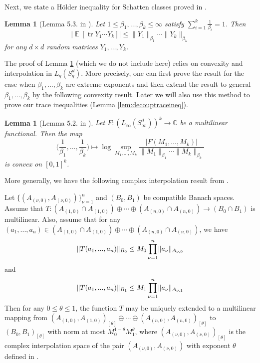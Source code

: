 \documentclass[11pt]{amsart}
\numberwithin{equation}{section}
\numberwithin{equation}{section}
\DeclareMathOperator{\E}{\mathbb{E}}
\DeclareMathOperator*{\tr}{tr}
\DeclarePairedDelimiter{\norm}{\lVert}{\rVert}
\newtheorem{lemma}[theorem]{Lemma}
\theoremstyle{remark}
\theoremstyle{definition}
\begin{document}
Next, we state a H\"older inequality for Schatten classes proved in \cite{brailovskaya2022universality}.

\begin{lemma}[Lemma 5.3. in \cite{brailovskaya2022universality}]
\label{lem:holdervanhandel}
Let $1\le 
\beta_1,\ldots,\beta_k\le\infty$ satisfy $\sum_{i=1}^k\frac{1}{\beta_i}=1$. Then
$$
	|\E[\tr Y_1\cdots Y_k]| \le
	\|Y_1\|_{\beta_1}\cdots \|Y_k\|_{\beta_k}
$$
for any $d\times d$ random matrices $Y_1,\ldots,Y_k$.
\end{lemma}

The proof of Lemma \ref{lem:holdervanhandel} (which we do not include here) relies on convexity and interpolation in $L_q(S_q^d)$. More precisely, one can first prove the result for the case when $\beta_1,...,\beta_k$ are extreme exponents and then extend the result to general $\beta_1,...,\beta_k$ by the following convexity result. Later we will also use this method to prove our trace inequalities (Lemma \ref{lem:decouptraceineq}).

\begin{lemma}[Lemma 5.2. in \cite{brailovskaya2022universality}]
\label{lem:calderon}
Let $F:(L_\infty(S_\infty^d))^k\to\mathbb{C}$ be a multilinear functional.
Then the map
$$
	\bigg(\frac{1}{\beta_1},\ldots,\frac{1}{\beta_k}\bigg)
	\mapsto
	\log \sup_{M_1,\ldots,M_k}
	\frac{|F(M_1,\ldots,M_k)|}{\|M_1\|_{\beta_1}\cdots\|M_k\|_{\beta_k}}
$$
is convex on $[0,1]^k$.
\end{lemma}

More generally, we have the following complex interpolation result from \cite{bergh2012interpolation}.
\begin{theorem}\label{thm:compinterp}
    Let $\{(A_{(\nu,0)},A_{(\nu,0)})\}_{\nu=1}^{n}$ and $(B_0,B_1)$ be compatible Banach spaces. Assume that $T: (A_{(1,0)} \cap A_{(1,0)}) \oplus \cdots \oplus (A_{(n,0)} \cap A_{(n,0)}) \to (B_0 \cap B_1)$ is multilinear.
    Also, assume that for any $(a_1,...,a_n) \in (A_{(1,0)} \cap A_{(1,0)}) \oplus \cdots \oplus (A_{(n,0)} \cap A_{(n,0)})$, we have
    \begin{align*}
        \norm{T(a_1,...,a_n)}_{B_0} \le M_0 \prod \limits_{\nu=1}^{n} \norm{a_{\nu}}_{A_{\nu,0}}
    \end{align*}
    and
    \begin{align*}
        \norm{T(a_1,...,a_n)}_{B_1} \le M_1 \prod \limits_{\nu=1}^{n} \norm{a_{\nu}}_{A_{\nu,1}}
    \end{align*}
    Then for any $0 \le \theta \le 1$, the function $T$ may be uniquely extended to a multilinear mapping from $(A_{(1,0)}, A_{(1,0)})_{[\theta]} \oplus \cdots \oplus (A_{(n,0)}, A_{(n,0)})_{[\theta]}$ to $(B_0,B_1)_{[\theta]}$ with norm at most $M_0^{1-\theta}M_1^{\theta}$, where $(A_{(\nu,0)}, A_{(\nu,0)})_{[\theta]}$ is the complex interpolation space of the pair $(A_{(\nu,0)}, A_{(\nu,0)})$ with exponent $\theta$ defined in \cite[p.88]{bergh2012interpolation}.
\end{theorem}
\end{document}
